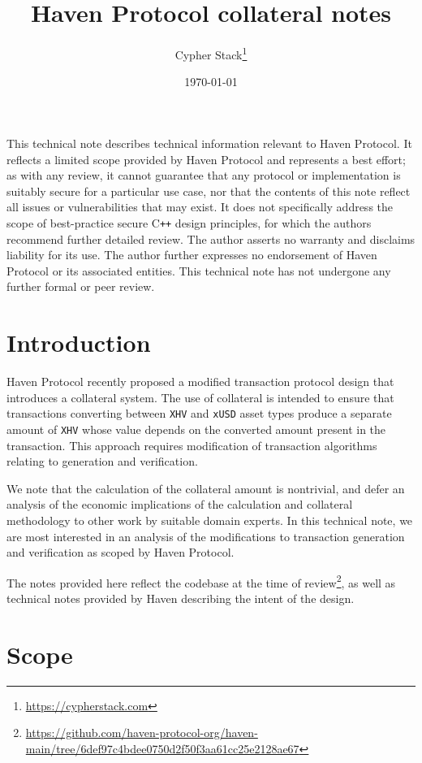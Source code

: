 \documentclass{article}
\title{Haven Protocol collateral notes}
\author{Cypher Stack\thanks{\url{https://cypherstack.com}}}
\date{\today}
\begin{document}
\maketitle

This technical note describes technical information relevant to Haven Protocol.
It reflects a limited scope provided by Haven Protocol and represents a best effort; as with any review, it cannot guarantee that any protocol or implementation is suitably secure for a particular use case, nor that the contents of this note reflect all issues or vulnerabilities that may exist.
It does not specifically address the scope of best-practice secure C\texttt{++} design principles, for which the authors recommend further detailed review.
The author asserts no warranty and disclaims liability for its use.
The author further expresses no endorsement of Haven Protocol or its associated entities.
This technical note has not undergone any further formal or peer review.


\section{Introduction}

Haven Protocol recently proposed a modified transaction protocol design that introduces a collateral system.
The use of collateral is intended to ensure that transactions converting between \texttt{XHV} and \texttt{xUSD} asset types produce a separate amount of \texttt{XHV} whose value depends on the converted amount present in the transaction.
This approach requires modification of transaction algorithms relating to generation and verification.

We note that the calculation of the collateral amount is nontrivial, and defer an analysis of the economic implications of the calculation and collateral methodology to other work by suitable domain experts.
In this technical note, we are most interested in an analysis of the modifications to transaction generation and verification as scoped by Haven Protocol.

The notes provided here reflect the codebase at the time of review\footnote{\url{https://github.com/haven-protocol-org/haven-main/tree/6def97c4bdee0750d2f50f3aa61cc25e2128ae67}}, as well as technical notes provided by Haven describing the intent of the design.


\section{Scope}
\end{document}
